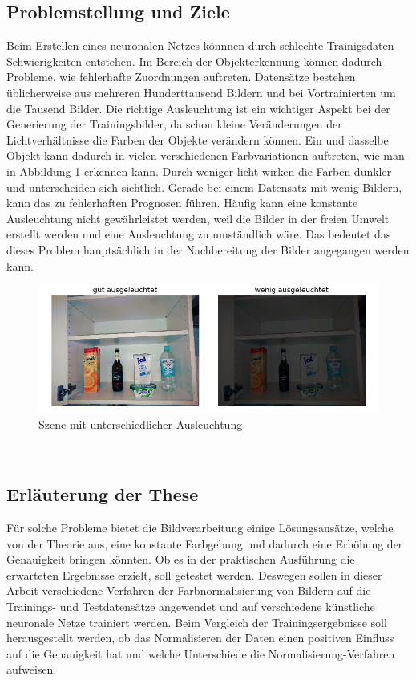 \documentclass[a4paper,12pt,oneside]{article}
\begin{document}
  \subsection{Problemstellung und Ziele}\label{s.probuziel} 
Beim Erstellen eines neuronalen Netzes könnnen durch schlechte Trainigsdaten Schwierigkeiten entstehen. Im Bereich der Objekterkennung können dadurch Probleme, wie fehlerhafte Zuordnungen auftreten. Datensätze bestehen üblicherweise aus mehreren Hunderttausend Bildern und bei Vortrainierten um die Tausend Bilder. Die richtige Ausleuchtung ist ein wichtiger Aspekt bei der Generierung der Trainingsbilder, da schon kleine Veränderungen der Lichtverhältnisse die Farben der Objekte verändern können. Ein und dasselbe Objekt kann dadurch in vielen verschiedenen Farbvariationen auftreten, wie man in Abbildung \ref{img:problem} erkennen kann. Durch weniger licht wirken die Farben dunkler und unterscheiden sich sichtlich. Gerade bei einem Datensatz mit wenig Bildern, kann das zu fehlerhaften Prognosen führen. Häufig kann eine konstante Ausleuchtung nicht gewährleistet werden, weil die Bilder in der freien Umwelt erstellt werden und eine Ausleuchtung zu umständlich wäre. Das bedeutet das dieses Problem hauptsächlich in der Nachbereitung der Bilder angegangen werden kann.
\begin{figure}
	[h]
	\centering
	\includegraphics[scale=0.7]{Sources/Vergleich.png}
	\caption{Szene mit unterschiedlicher Ausleuchtung}
	\label{img:problem}
\end{figure}\\
  \subsection{Erläuterung der These}\label{s.these}
Für solche Probleme bietet die Bildverarbeitung einige Lösungsansätze, welche von der Theorie aus, eine konstante Farbgebung und dadurch eine Erhöhung der Genauigkeit bringen könnten. Ob es in der praktischen Ausführung die erwarteten Ergebnisse erzielt, soll getestet werden. Deswegen sollen in dieser Arbeit verschiedene Verfahren der Farbnormalisierung von Bildern auf die Trainings- und Testdatensätze angewendet und auf verschiedene künstliche neuronale Netze trainiert werden. Beim Vergleich der Trainingsergebnisse soll herausgestellt werden, ob das Normalisieren der Daten einen positiven Einfluss auf die Genauigkeit hat und welche Unterschiede die Normalisierung-Verfahren aufweisen.\\
\end{document}
